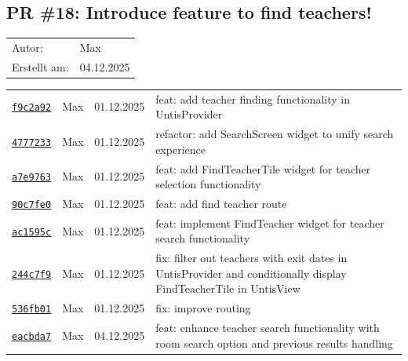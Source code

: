 \documentclass{article}%
\begin{document}
%
\subsection{PR \#18: Introduce feature to find teachers!}%
\label{pr:18}%
\begin{tabular}{l l}%
Autor:&Max\\%
Erstellt am: &04.12.2025\\%
\end{tabular}%
\begin{longtable}{l l l p{12cm}}%
\href{https://github.com/scriptor1000/homeworks/pull/18/commits/f9c2a927c11bd1c62b769fbb9111e417054fc753}{\underline{\texttt{f9c2a92}}}&Max&01.12.2025&feat: add teacher finding functionality in UntisProvider\\%
\href{https://github.com/scriptor1000/homeworks/pull/18/commits/47772332e1f2b97678b8fa406fb7017ed1831d45}{\underline{\texttt{4777233}}}&Max&01.12.2025& refactor: add SearchScreen widget to unify search experience\\%
\href{https://github.com/scriptor1000/homeworks/pull/18/commits/a7e976341f457af39b8655a299c06a695cf3c7ee}{\underline{\texttt{a7e9763}}}&Max&01.12.2025&feat: add FindTeacherTile widget for teacher selection functionality\\%
\href{https://github.com/scriptor1000/homeworks/pull/18/commits/90c7fe0224b321a2ff6c0f3dc0eef319d0635dcf}{\underline{\texttt{90c7fe0}}}&Max&01.12.2025&feat: add find teacher route\\%
\href{https://github.com/scriptor1000/homeworks/pull/18/commits/ac1595cfaf8e3d740ae5bc0a6d2477edaceefb91}{\underline{\texttt{ac1595c}}}&Max&01.12.2025&feat: implement FindTeacher widget for teacher search functionality\\%
\href{https://github.com/scriptor1000/homeworks/pull/18/commits/244c7f910e5862a52853121942b9d8dbd05e0704}{\underline{\texttt{244c7f9}}}&Max&01.12.2025&fix: filter out teachers with exit dates in UntisProvider and conditionally display FindTeacherTile in UntisView\\%
\href{https://github.com/scriptor1000/homeworks/pull/18/commits/536fb01f3c2af144b0fdfa57e0b53a42c6ca0dbd}{\underline{\texttt{536fb01}}}&Max&01.12.2025&fix: improve routing\\%
\href{https://github.com/scriptor1000/homeworks/pull/18/commits/eacbda7b1705056de6cbd29ca550914478037569}{\underline{\texttt{eacbda7}}}&Max&04.12.2025&feat: enhance teacher search functionality with room search option and previous results handling\\%

\end{longtable}
\end{document}
